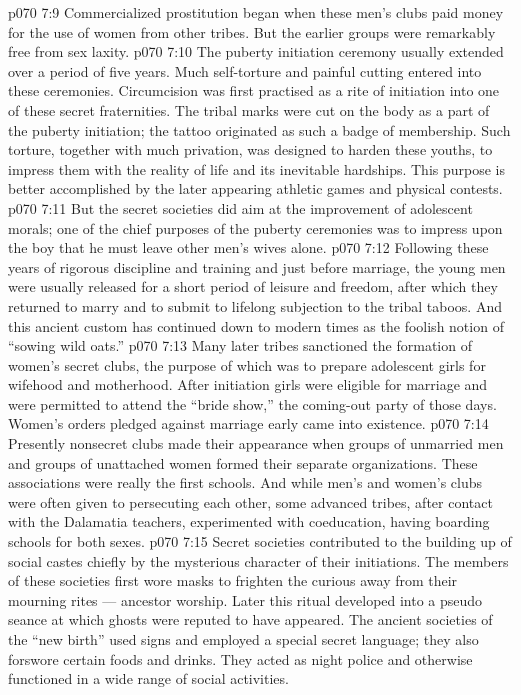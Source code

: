 \vs p070 7:9 Commercialized prostitution began when these men’s clubs paid money for the use of women from other tribes. But the earlier groups were remarkably free from sex laxity.
\vs p070 7:10 The puberty initiation ceremony usually extended over a period of five years. Much self\hyp{}torture and painful cutting entered into these ceremonies. Circumcision was first practised as a rite of initiation into one of these secret fraternities. The tribal marks were cut on the body as a part of the puberty initiation; the tattoo originated as such a badge of membership. Such torture, together with much privation, was designed to harden these youths, to impress them with the reality of life and its inevitable hardships. This purpose is better accomplished by the later appearing athletic games and physical contests.
\vs p070 7:11 But the secret societies did aim at the improvement of adolescent morals; one of the chief purposes of the puberty ceremonies was to impress upon the boy that he must leave other men’s wives alone.
\vs p070 7:12 Following these years of rigorous discipline and training and just before marriage, the young men were usually released for a short period of leisure and freedom, after which they returned to marry and to submit to lifelong subjection to the tribal taboos. And this ancient custom has continued down to modern times as the foolish notion of “sowing wild oats.”
\vs p070 7:13 \pc Many later tribes sanctioned the formation of women’s secret clubs, the purpose of which was to prepare adolescent girls for wifehood and motherhood. After initiation girls were eligible for marriage and were permitted to attend the “bride show,” the coming\hyp{}out party of those days. Women’s orders pledged against marriage early came into existence.
\vs p070 7:14 Presently nonsecret clubs made their appearance when groups of unmarried men and groups of unattached women formed their separate organizations. These associations were really the first schools. And while men’s and women’s clubs were often given to persecuting each other, some advanced tribes, after contact with the Dalamatia teachers, experimented with coeducation, having boarding schools for both sexes.
\vs p070 7:15 \pc Secret societies contributed to the building up of social castes chiefly by the mysterious character of their initiations. The members of these societies first wore masks to frighten the curious away from their mourning rites --- ancestor worship. Later this ritual developed into a pseudo seance at which ghosts were reputed to have appeared. The ancient societies of the “new birth” used signs and employed a special secret language; they also forswore certain foods and drinks. They acted as night police and otherwise functioned in a wide range of social activities.
